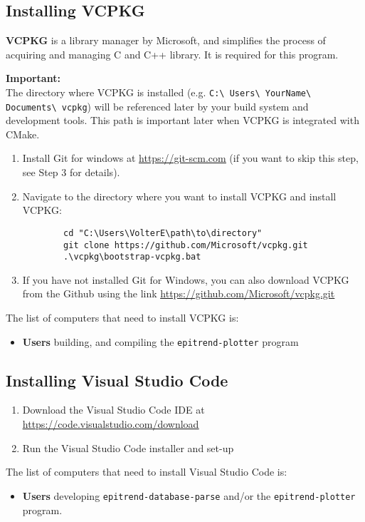 \documentclass{article}
\begin{document}
\subsection{Installing VCPKG}
\label{sec:Installing_VCPKG}
\textbf{VCPKG} is a library manager by Microsoft, and simplifies the process of acquiring and managing C and C++ library. It is required for this program.

\vspace{10pt}
\noindent
\textbf{Important:}
\\
\noindent
The directory where VCPKG is installed (e.g. \texttt{C:\textbackslash
Users\textbackslash
YourName\textbackslash
Documents\textbackslash
vcpkg}) will be referenced later by your build system and development tools. This path is important later when VCPKG is integrated with CMake.

\begin{enumerate}
    \item Install Git for windows at \href{https://git-scm.com}{\underline{https://git-scm.com}} (if you want to skip this step, see Step 3 for details).
    
    \item Navigate to the directory where you want to install VCPKG and install VCPKG:
    \begin{verbatim}
        cd "C:\Users\VolterE\path\to\directory"
        git clone https://github.com/Microsoft/vcpkg.git
        .\vcpkg\bootstrap-vcpkg.bat
    \end{verbatim}

    \item If you have not installed Git for Windows, you can also download VCPKG from the Github using the link \href{https://github.com/Microsoft/vcpkg.git}{\underline{https://github.com/Microsoft/vcpkg.git}}
\end{enumerate}

The list of computers that need to install VCPKG is:
\begin{itemize}
    \item \textbf{Users} building, and compiling the \texttt{epitrend-plotter} program
\end{itemize}

\subsection{Installing Visual Studio Code}

\begin{enumerate}
    \item Download the Visual Studio Code IDE at \href{https://code.visualstudio.com/download}{\underline{https://code.visualstudio.com/download}}
    
    \item Run the Visual Studio Code installer and set-up
\end{enumerate} 
The list of computers that need to install Visual Studio Code is:
\begin{itemize}
    \item \textbf{Users} developing \texttt{epitrend-database-parse} and/or the \texttt{epitrend-plotter} program.
\end{itemize}
\end{document}
